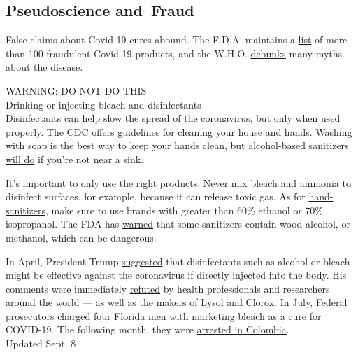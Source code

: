 \hypertarget{pseudoscience-and-fraud}{%
\subsection{Pseudoscience and~Fraud}\label{pseudoscience-and-fraud}}

False claims about Covid-19 cures abound. The F.D.A. maintains a
\href{https://www.fda.gov/consumers/health-fraud-scams/fraudulent-coronavirus-disease-2019-covid-19-products}{list}
of more than 100 fraudulent Covid-19 products, and the W.H.O.
\href{https://www.who.int/emergencies/diseases/novel-coronavirus-2019/advice-for-public/myth-busters}{debunks}
many myths about the disease.

WARNING: DO NOT DO THIS\\
Drinking or injecting bleach and disinfectants\\
Disinfectants can help slow the spread of the coronavirus, but only when
used properly. The CDC offers
\href{https://www.cdc.gov/coronavirus/2019-ncov/prevent-getting-sick/cleaning-disinfection.html}{guidelines}
for cleaning your house and hands. Washing with soap is the best way to
keep your hands clean, but alcohol-based sanitizers
\href{https://www.cdc.gov/coronavirus/2019-ncov/hcp/hand-hygiene.html}{will
do} if you're not near a sink.

It's important to only use the right products. Never mix bleach and
ammonia to disinfect surfaces, for example, because it can release toxic
gas. As for
\href{https://www.cdc.gov/coronavirus/2019-ncov/hcp/hand-hygiene.html}{hand-sanitizers},
make sure to use brands with greater than 60\% ethanol or 70\%
isopropanol. The FDA has
\href{https://www.fda.gov/news-events/press-announcements/coronavirus-covid-19-update-fda-reiterates-warning-about-dangerous-alcohol-based-hand-sanitizers}{warned}
that some sanitizers contain wood alcohol, or methanol, which can be
dangerous.

In April, President Trump
\href{https://www.nytimes3xbfgragh.onion/2020/04/24/health/sunlight-coronavirus-trump.html}{suggested}
that disinfectants such as alcohol or bleach might be effective against
the coronavirus if directly injected into the body. His comments were
immediately
\href{https://www.nytimes3xbfgragh.onion/2020/04/24/us/politics/trump-inject-disinfectant-bleach-coronavirus.html}{refuted}
by health professionals and researchers around the world --- as well as
the
\href{https://www.prweek.com/article/1681380/lysol-clorox-respond-trump-comment-injecting-disinfectant}{makers
of Lysol and Clorox}. In July, Federal prosecutors
\href{https://www.wtsp.com/article/news/regional/florida/miracle-mineral-solution-genesis-ii-church-of-health-and-healing/67-b33b7f2e-2b0c-4853-8434-90732359d730}{charged}
four Florida men with marketing bleach as a cure for COVID-19. The
following month, they were
\href{https://www.theguardian.com/us-news/2020/aug/12/mark-grenon-archbishop-florida-church-selling-bleach-miracle-cure-arrested-son}{arrested
in Colombia}.\\
Updated Sept. 8

